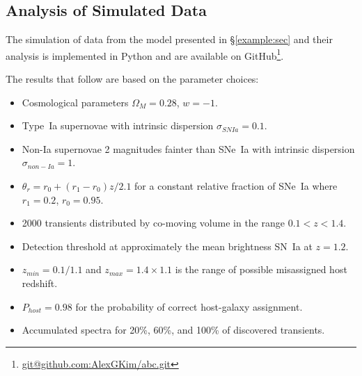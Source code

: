 \documentclass[preprint]{aastex}
\begin{document}

\subsection{Analysis of Simulated Data}
The simulation of data from the model presented in \S\ref{example:sec}
and their analysis is implemented in Python and are available
on GitHub\footnote{\url{git@github.com:AlexGKim/abc.git}}.

The results that follow are based on the parameter
choices:
\begin{itemize}
\item Cosmological parameters $\Omega_M=0.28$, $w=-1$.
\item Type~Ia supernovae with intrinsic dispersion $\sigma_{SNIa}=0.1$.
\item Non-Ia supernovae 2 magnitudes fainter than SNe~Ia with intrinsic
dispersion $\sigma_{non-Ia}=1$.
\item $\theta_r=r_0 + (r_1-r_0)z/2.1$ for a constant relative fraction of SNe~Ia where $r_1=0.2$,
$r_0=0.95$.
\item 2000 transients distributed by co-moving volume in the range $0.1<z<1.4$.
\item Detection threshold at approximately the mean brightness SN~Ia at $z=1.2$.
\item $z_{min}=0.1/1.1$ and $z_{max}=1.4\times 1.1$ is the range of possible misassigned
host redshift.
\item $P_{host}=0.98$ for the probability of correct host-galaxy assignment.
\item Accumulated spectra for 20\%, 60\%, and 100\% of discovered transients.
\end{itemize}
\end{document}
